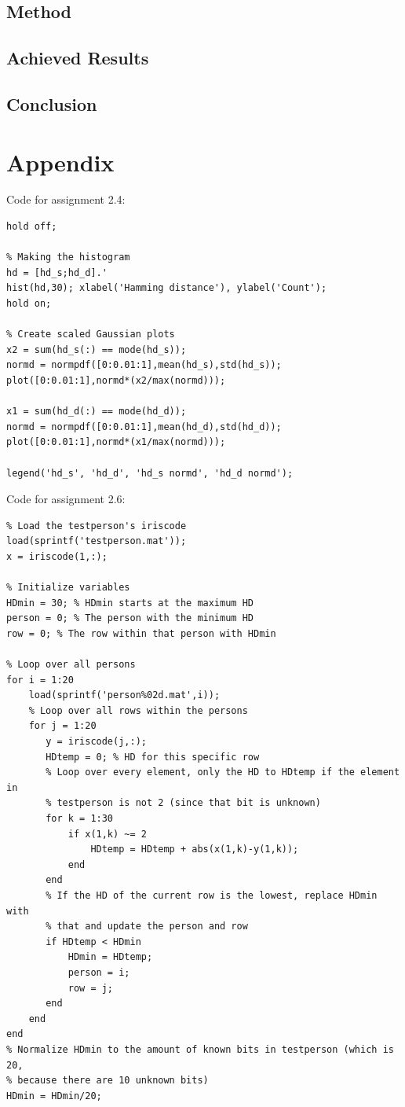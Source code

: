 \documentclass{article}
\begin{document}
\subsection{Method}
\subsection{Achieved Results}
\subsection{Conclusion}




\section*{Appendix}
Code for assignment 2.4:
\begin{lstlisting}
hold off;

% Making the histogram
hd = [hd_s;hd_d].'
hist(hd,30); xlabel('Hamming distance'), ylabel('Count');
hold on;

% Create scaled Gaussian plots
x2 = sum(hd_s(:) == mode(hd_s));
normd = normpdf([0:0.01:1],mean(hd_s),std(hd_s));
plot([0:0.01:1],normd*(x2/max(normd)));

x1 = sum(hd_d(:) == mode(hd_d));
normd = normpdf([0:0.01:1],mean(hd_d),std(hd_d));
plot([0:0.01:1],normd*(x1/max(normd)));

legend('hd_s', 'hd_d', 'hd_s normd', 'hd_d normd');
\end{lstlisting}

Code for assignment 2.6:
\begin{lstlisting}
% Load the testperson's iriscode
load(sprintf('testperson.mat')); 
x = iriscode(1,:);

% Initialize variables
HDmin = 30; % HDmin starts at the maximum HD
person = 0; % The person with the minimum HD
row = 0; % The row within that person with HDmin

% Loop over all persons
for i = 1:20
    load(sprintf('person%02d.mat',i));
    % Loop over all rows within the persons
    for j = 1:20
       y = iriscode(j,:);
       HDtemp = 0; % HD for this specific row
       % Loop over every element, only the HD to HDtemp if the element in
       % testperson is not 2 (since that bit is unknown)
       for k = 1:30
           if x(1,k) ~= 2
               HDtemp = HDtemp + abs(x(1,k)-y(1,k));
           end
       end
       % If the HD of the current row is the lowest, replace HDmin with
       % that and update the person and row
       if HDtemp < HDmin
           HDmin = HDtemp;
           person = i;
           row = j;
       end
    end
end
% Normalize HDmin to the amount of known bits in testperson (which is 20,
% because there are 10 unknown bits)
HDmin = HDmin/20;
\end{lstlisting}
\end{document}
